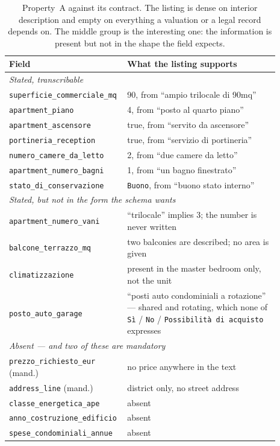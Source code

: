 \begin{table}[htbp]
\centering
\small
\begin{tabular}{p{0.34\linewidth}p{0.55\linewidth}}
\hline
\textbf{Field} & \textbf{What the listing supports} \\
\hline
\multicolumn{2}{l}{\emph{Stated, transcribable}} \\
\hline
\footnotesize{\texttt{superficie\_commerciale\_mq}} & 90, from ``ampio trilocale di 90mq'' \\
\footnotesize{\texttt{apartment\_piano}} & 4, from ``posto al quarto piano'' \\
\footnotesize{\texttt{apartment\_ascensore}} & true, from ``servito da ascensore'' \\
\footnotesize{\texttt{portineria\_reception}} & true, from ``servizio di portineria'' \\
\footnotesize{\texttt{numero\_camere\_da\_letto}} & 2, from ``due camere da letto'' \\
\footnotesize{\texttt{apartment\_numero\_bagni}} & 1, from ``un bagno finestrato'' \\
\footnotesize{\texttt{stato\_di\_conservazione}} & \texttt{Buono}, from ``buono stato interno'' \\
\hline
\multicolumn{2}{l}{\emph{Stated, but not in the form the schema wants}} \\
\hline
\footnotesize{\texttt{apartment\_numero\_vani}} & ``trilocale'' implies 3; the number is never written \\
\footnotesize{\texttt{balcone\_terrazzo\_mq}} & two balconies are described; no area is given \\
\footnotesize{\texttt{climatizzazione}} & present in the master bedroom only, not the unit \\
\footnotesize{\texttt{posto\_auto\_garage}} & ``posti auto condominiali a rotazione'' --- shared and rotating, which none of \texttt{Sì} / \texttt{No} / \texttt{Possibilità di acquisto} expresses \\
\hline
\multicolumn{2}{l}{\emph{Absent --- and two of these are mandatory}} \\
\hline
\footnotesize{\texttt{prezzo\_richiesto\_eur}} (mand.) & no price anywhere in the text \\
\footnotesize{\texttt{address\_line} (mand.)} & district only, no street address \\
\footnotesize{\texttt{classe\_energetica\_ape}} & absent \\
\footnotesize{\texttt{anno\_costruzione\_edificio}} & absent \\
\footnotesize{\texttt{spese\_condominiali\_annue}} & absent \\
\hline
\end{tabular}
\caption{Property~A against its contract. The listing is dense on interior description and empty on everything a valuation or a legal record depends on. The middle group is the interesting one: the information is present but not in the shape the field expects.}
\label{tab:property-a-coverage}
\end{table}

